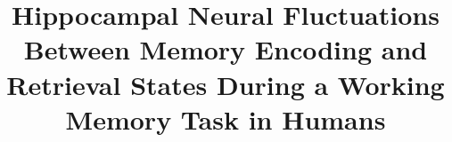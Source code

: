 \title{
Hippocampal Neural Fluctuations Between Memory Encoding and Retrieval States During a Working Memory Task in Humans
}